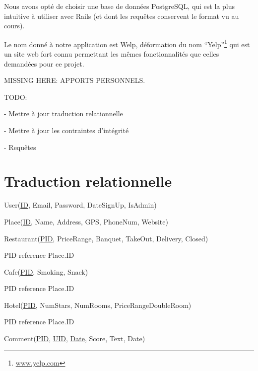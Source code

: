 \documentclass[a4paper,10pt]{article}
\begin{document}
Nous avons opté de choisir une base de données PostgreSQL, qui est la plus intuitive à utiliser avec Rails (et dont les requêtes conservent le format vu au cours).

Le nom donné à notre application est Welp, déformation du nom ``Yelp''\footnote{\url{www.yelp.com}} qui est un site web fort connu permettant les mêmes fonctionnalités que celles demandées pour ce projet.

MISSING HERE: APPORTS PERSONNELS.

TODO: 

- Mettre à jour traduction relationnelle

- Mettre à jour les contraintes d'intégrité

- Requêtes

\begin{landscape}



\end{landscape}

\section{Traduction relationnelle}

\noindent User(\underline{ID}, Email, Password, DateSignUp, IsAdmin)

\hspace{-0,5cm}Place(\underline{ID}, Name, Address, GPS, PhoneNum, Website)

\hspace{-0,5cm}Restaurant(\underline{PID}, PriceRange, Banquet, TakeOut, Delivery, Closed)

PID reference Place.ID

\hspace{-0,5cm}Cafe(\underline{PID}, Smoking, Snack)

PID reference Place.ID

\hspace{-0,5cm}Hotel(\underline{PID}, NumStars, NumRooms, PriceRangeDoubleRoom)

PID reference Place.ID

\hspace{-0,5cm}Comment(\underline{PID}, \underline{UID}, \underline{Date}, Score, Text, Date)
\end{document}
